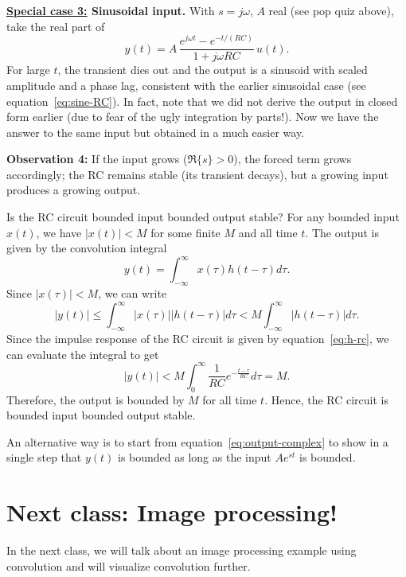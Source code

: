 \textbf{\ul{Special case 3:} Sinusoidal input.} With $s=j\omega$, $A$ real (see pop quiz above), take the real part of
    \[
    y(t)=A\,\frac{e^{j\omega t}-e^{-t/(RC)}}{1+j\omega RC}\,u(t).
    \]
For large $t$, the transient dies out and the output is a sinusoid with scaled amplitude and a phase lag, consistent with the earlier sinusoidal case (see equation~\eqref{eq:sine-RC}). In fact, note that we did not derive the output in closed form earlier (due to fear of the ugly integration by parts!). Now we have the answer to the same input but obtained in a much easier way. 

\textbf{Observation 4:} If the input grows ($\Re\{s\}>0$), the forced term grows accordingly; the RC remains stable (its transient decays), but a growing input produces a growing output.
\begin{popquiz}
    Is the RC circuit bounded input bounded output stable? 
    \popqsplit 
    For any bounded input $x(t)$, we have $|x(t)| < M$ for some finite $M$ and all time $t$. The output is given by the convolution integral
    \[
    y(t) = \int_{-\infty}^{\infty} x(\tau) h(t - \tau) d\tau.
    \]
    Since $|x(\tau)| < M$, we can write
    \[
    |y(t)| \leq \int_{-\infty}^{\infty} |x(\tau)| |h(t - \tau)| d\tau < M \int_{-\infty}^{\infty} |h(t - \tau)| d\tau.
    \]
    Since the impulse response of the RC circuit is given by equation~\eqref{eq:h-rc}, we can evaluate the integral to get
    \[
    |y(t)| < M \int_{0}^{\infty} \frac{1}{RC} e^{-\frac{t - \tau}{RC}} d\tau = M.
    \]
    Therefore, the output is bounded by $M$ for all time $t$. Hence, the RC circuit is bounded input bounded output stable.

    An alternative way is to start from equation~\eqref{eq:output-complex} to show in a single step that $y(t)$ is bounded as long as the input $Ae^{st}$ is bounded. 
\end{popquiz}

\section{Next class: Image processing!}
In the next class, we will talk about an image processing example using convolution and will visualize convolution further. 
